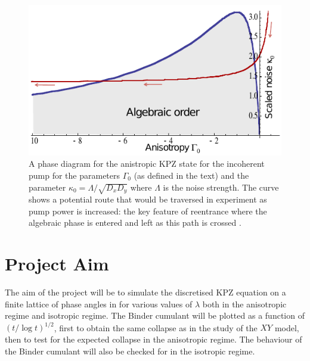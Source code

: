 \begin{figure}[htbp!]
	\centering
	\includegraphics[scale=0.7]{incoherentanisotropic.pdf}
	\caption{A phase diagram for the anistropic KPZ state for the incoherent pump for the parameters $\Gamma_0$ (as defined in the text) and the parameter $\kappa_0 = \Lambda/\sqrt{D_x D_y}$ where $\Lambda$ is the noise strength. 
	The curve shows a potential route that would be traversed in experiment as pump power is increased: the key feature of reentrance where the algebraic phase is entered and left as this path is crossed \cite{2015PhRvX...5a1017A}.}
	\label{fig:incoherentanisotropic}
\end{figure}

\section{Project Aim}

The aim of the project will be to simulate the discretised KPZ equation on a finite lattice of phase angles in for various values of $\lambda$ both in the anisotropic regime and isotropic regime. The Binder cumulant will be plotted as a function of $(t/\log t)^{1/2}$, first to obtain the same collapse as in the study of the $XY$ model, then to test for the expected collapse in the anisotropic regime. The behaviour of the Binder cumulant will also be checked for in the isotropic regime. 

